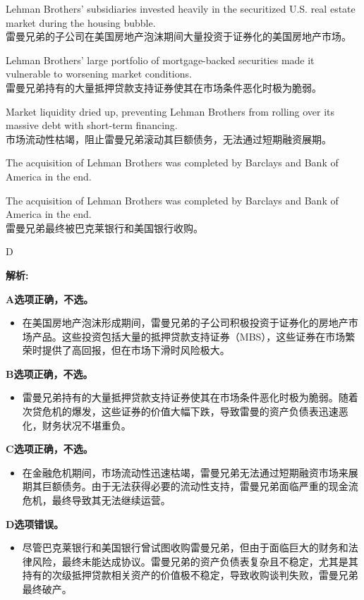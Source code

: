 \documentclass{article}
\newenvironment{explanation}
{\textbf{解析:}\par}
{\par}
\begin{document}
\begin{choices}
    \item Lehman Brothers' subsidiaries invested heavily in the securitized U.S. real estate market during the housing bubble. \\
    雷曼兄弟的子公司在美国房地产泡沫期间大量投资于证券化的美国房地产市场。
    \item Lehman Brothers' large portfolio of mortgage-backed securities made it vulnerable to worsening market conditions. \\
    雷曼兄弟持有的大量抵押贷款支持证券使其在市场条件恶化时极为脆弱。
    \item Market liquidity dried up, preventing Lehman Brothers from rolling over its massive debt with short-term financing. \\
    市场流动性枯竭，阻止雷曼兄弟滚动其巨额债务，无法通过短期融资展期。
    \item The acquisition of Lehman Brothers was completed by Barclays and Bank of America in the end.
    \item The acquisition of Lehman Brothers was completed by Barclays and Bank of America in the end. \\
    雷曼兄弟最终被巴克莱银行和美国银行收购。
\end{choices}

\begin{correctanswer}
    D
\end{correctanswer}

\begin{explanation}
    \textbf{A选项正确，不选。}
    \begin{itemize}
        \item 在美国房地产泡沫形成期间，雷曼兄弟的子公司积极投资于证券化的房地产市场产品。这些投资包括大量的抵押贷款支持证券（MBS），这些证券在市场繁荣时提供了高回报，但在市场下滑时风险极大。
    \end{itemize}

    \textbf{B选项正确，不选。}
    \begin{itemize}
        \item 雷曼兄弟持有的大量抵押贷款支持证券使其在市场条件恶化时极为脆弱。随着次贷危机的爆发，这些证券的价值大幅下跌，导致雷曼的资产负债表迅速恶化，财务状况不堪重负。
    \end{itemize}

    \textbf{C选项正确，不选。}
    \begin{itemize}
        \item 在金融危机期间，市场流动性迅速枯竭，雷曼兄弟无法通过短期融资市场来展期其巨额债务。由于无法获得必要的流动性支持，雷曼兄弟面临严重的现金流危机，最终导致其无法继续运营。
    \end{itemize}

    \textbf{D选项错误。}
    \begin{itemize}
        \item 尽管巴克莱银行和美国银行曾试图收购雷曼兄弟，但由于面临巨大的财务和法律风险，最终未能达成协议。雷曼兄弟的资产负债表复杂且不稳定，尤其是其持有的次级抵押贷款相关资产的价值极不稳定，导致收购谈判失败，雷曼兄弟最终破产。
    \end{itemize}
\end{explanation}
\end{document}
